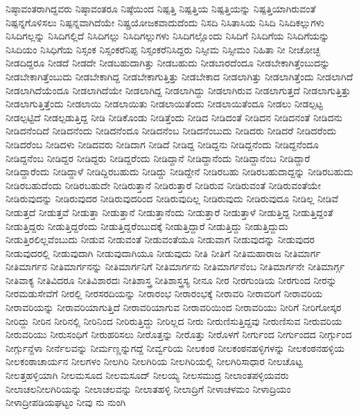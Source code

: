 {ನಿಷ್ಠಾವಂತರಾಗಿದ್ದವರು
ನಿಷ್ಠಾವಂತರೂ
ನಿಷ್ಠೆಯಿಂದ
ನಿಷ್ಪತ್ತಿ
ನಿಷ್ಪತ್ತಿಯ
ನಿಷ್ಪತ್ತಿಯನ್ನು
ನಿಷ್ಪತ್ತಿಯಾಗಿರುವಂತೆ
ನಿಷ್ಪನ್ನಗೊಳಿಸಲು
ನಿಷ್ಪನ್ನವಾಗಿದೆಯೇ
ನಿಷ್ಪ್ರಯೋಜಕವಾದುದೆಂದು
ನಿಸದಿ
ನಿಸಿತಾಸಿಯ
ನಿಸಿದಿ
ನಿಸಿದಿಕಲ್ಲುಗಳು
ನಿಸಿದಿಗಲ್ಲನ್ನು
ನಿಸಿದಿಗಲ್ಲಿದೆ
ನಿಸಿದಿಗಲ್ಲು
ನಿಸಿದಿಗಲ್ಲುಗಳು
ನಿಸಿದಿಗಲ್ಲೊಂದು
ನಿಸಿದಿಗೆ
ನಿಸಿದಿಗೆಯ
ನಿಸಿದಿಗೆಯನ್ನು
ನಿಸಿದಿಯಂ
ನಿಸಿಧಿಗೆಯ
ನಿಸ್ಸಂಕ
ನಿಸ್ಸಂಕರೆನಿಪ್ಪ
ನಿಸ್ಸಂಕರೆನಿಸಿದ್ದರು
ನಿಸ್ಸೀಮ
ನಿಸ್ಸೀಮಂ
ನಿಹಿತಾ
ನೀ
ನೀಚೋಚ್ಛ
ನೀಡದಿದ್ದರೂ
ನೀಡದೆ
ನೀಡದೇ
ನೀಡಬಹುದಾಗಿತ್ತು
ನೀಡಬಹುದು
ನೀಡಬಾರದೆಂದೂ
ನೀಡಬೇಕಾಗಿತ್ತೆಂಬುದನ್ನು
ನೀಡಬೇಕಾಗಿತ್ತೆಂಬುದು
ನೀಡಬೇಕಾಗಿದ್ದ
ನೀಡಬೇಕಾಗುತ್ತಿತ್ತು
ನೀಡಬೇಕಾದ
ನೀಡಲಾಗಿತ್ತು
ನೀಡಲಾಗಿತ್ತೆಂದು
ನೀಡಲಾಗಿದೆ
ನೀಡಲಾಗಿದೆಯೆಂದೂ
ನೀಡಲಾಗಿದೆಯೇ
ನೀಡಲಾಗಿದ್ದ
ನೀಡಲಾಗಿದ್ದು
ನೀಡಲಾಗಿರುವ
ನೀಡಲಾಗುತ್ತದೆ
ನೀಡಲಾಗುತ್ತಿತ್ತು
ನೀಡಲಾಗುತ್ತಿತ್ತೆಂದು
ನೀಡಲಾಯಿ
ನೀಡಲಾಯಿತು
ನೀಡಲಾಯಿತೆಂದು
ನೀಡಲಾಯಿತೆಂದೂ
ನೀಡಲು
ನೀಡಲ್ಪಟ್ಟ
ನೀಡಲ್ಪಟ್ಟಿದೆ
ನೀಡಲ್ಪಡುತ್ತಿದ್ದ
ನೀಡಿ
ನೀಡಿಕೊಂಡು
ನೀಡಿತ್ತೆಂದು
ನೀಡಿದ
ನೀಡಿದಂತೆ
ನೀಡಿದನ
ನೀಡಿದನಂತೆ
ನೀಡಿದನು
ನೀಡಿದನೆಂದಿದೆ
ನೀಡಿದನೆಂದು
ನೀಡಿದನೆಂದೂ
ನೀಡಿದನೆಂಬ
ನೀಡಿದನೆಂಬುದು
ನೀಡಿದರು
ನೀಡಿದರೆ
ನೀಡಿದರೆಂದು
ನೀಡಿದರೆಂಬ
ನೀಡಿದಳು
ನೀಡಿದವರು
ನೀಡಿದಾಗ
ನೀಡಿದೆ
ನೀಡಿದ್ದ
ನೀಡಿದ್ದನು
ನೀಡಿದ್ದನೆಂದು
ನೀಡಿದ್ದನೆಂದೂ
ನೀಡಿದ್ದನೆಂಬ
ನೀಡಿದ್ದರ
ನೀಡಿದ್ದರು
ನೀಡಿದ್ದರೆಂದು
ನೀಡಿದ್ದಾನೆ
ನೀಡಿದ್ದಾನೆಂದು
ನೀಡಿದ್ದಾನೆಂಬ
ನೀಡಿದ್ದಾರೆ
ನೀಡಿದ್ದಾರೆಂದು
ನೀಡಿದ್ದಾಳೆ
ನೀಡಿದ್ದಿರಬಹುದು
ನೀಡಿದ್ದು
ನೀಡಿದ್ದೇನೆ
ನೀಡಿರಬಹು
ನೀಡಿರಬಹುದಾದ್ದನ್ನು
ನೀಡಿರಬಹುದು
ನೀಡಿರಬಹುದೆಂದು
ನೀಡಿರಬಹುದೇ
ನೀಡಿರುತ್ತಾನೆ
ನೀಡಿರುತ್ತಾರೆ
ನೀಡಿರುವ
ನೀಡಿರುವಂತೆ
ನೀಡಿರುವಂತೆಯೇ
ನೀಡಿರುವುದನ್ನು
ನೀಡಿರುವುದರ
ನೀಡಿರುವುದರಿಂದ
ನೀಡಿರುವುದಿಲ್ಲ
ನೀಡಿರುವುದು
ನೀಡಿರುವುದೂ
ನೀಡಿಲ್ಲ
ನೀಡಿವೆ
ನೀಡುತ್ತದೆ
ನೀಡುತ್ತವೆ
ನೀಡುತ್ತಾ
ನೀಡುತ್ತಾನೆ
ನೀಡುತ್ತಾನೆಂದು
ನೀಡುತ್ತಾರೆ
ನೀಡುತ್ತಾಳೆ
ನೀಡುತ್ತಿದ್ದ
ನೀಡುತ್ತಿದ್ದಂತೆ
ನೀಡುತ್ತಿದ್ದರು
ನೀಡುತ್ತಿದ್ದರೆಂದು
ನೀಡುತ್ತಿದ್ದರೆಂಬುದಕ್ಕೆ
ನೀಡುತ್ತಿದ್ದಾರೆ
ನೀಡುತ್ತಿದ್ದು
ನೀಡುತ್ತಿದ್ದುದು
ನೀಡುತ್ತಿರಲಿಲ್ಲವೆಂಬುದು
ನೀಡುವ
ನೀಡುವಂತೆ
ನೀಡುವಂತೆಯೂ
ನೀಡುವಾಗ
ನೀಡುವುದನ್ನು
ನೀಡುವುದರ
ನೀಡುವುದರಲ್ಲಿ
ನೀಡುವುದಾಗಿ
ನೀಡುವುದಾಗಿಯೂ
ನೀಡುವುದು
ನೀತಿ
ನೀತಿಗೆ
ನೀತಿಮಹಾರಾಜ
ನೀತಿಮಾರ್ಗ
ನೀತಿಮಾರ್ಗನ
ನೀತಿಮಾರ್ಗನನ್ನು
ನೀತಿಮಾರ್ಗನಿಗೆ
ನೀತಿಮಾರ್ಗನು
ನೀತಿಮಾರ್ಗನೆಂಬ
ನೀತಿಮಾರ್ಗನೇ
ನೀತಿಮಾರ್ಗ್ಗ
ನೀತಿವಾಕ್ಯ
ನೀತಿವಿದರೂ
ನೀತಿವಿಶಾರದಃ
ನೀತಿಶಾಸ್ತ್ರ
ನೀತಿಶಾಸ್ತ್ರಸ್ಯ
ನೀನೂ
ನೀರ
ನೀರಗುಂಡಿಯ
ನೀರಗುಂದ
ನೀರನ್ನು
ನೀರಮಡುಸೇವೆಗೆ
ನೀರಲ್ಲಿ
ನೀರಸರದಿಯನ್ನು
ನೀರಾರಂಭ
ನೀರಾರಂಭಕ್ಕೆ
ನೀರಾವರಿ
ನೀರಾವರಿಗೆ
ನೀರಾವರಿಯ
ನೀರಾವರಿಯನ್ನು
ನೀರಾವರಿಯಾಗುತ್ತಿದೆ
ನೀರಾವರಿಯಾಗುವ
ನೀರಾವರಿಯಿಂದ
ನೀರಾವರಿಯು
ನೀರಿಗೆ
ನೀರಿಗೋಸ್ಕರ
ನೀರಿದ್ದು
ನೀರಿನ
ನೀರಿನಲ್ಲಿ
ನೀರಿನಿಂದ
ನೀರಿರುತ್ತಿದ್ದು
ನೀರಿಲ್ಲದ
ನೀರು
ನೀರುಣಿಸುತ್ತಿದ್ದವು
ನೀರುಣಿಸುವ
ನೀರುವರಿಯ
ನೀರುವರಿಯು
ನೀರುಸಂಧಿಗೆ
ನೀರುಹರಿಸಲು
ನೀರೊತ್ತನ್ನು
ನೀರೊತ್ತು
ನೀರೊಳಗೆ
ನೀರ್ಗುಂದ
ನೀರ್ಗುಂದದ
ನೀರ್ಗ್ಗುಂದ
ನೀರ್ಗ್ಗುನ್ದೆಳಾ
ನೀರ್ನೆಲವನ್ನು
ನೀರ್ಮಣ್ಣನ್ನುಗದ್ದೆ
ನೀರ್ವ್ವರಿಯ
ನೀಲಕಂಠ
ನೀಲಕಂಠನಹಳ್ಳಿಗಳನ್ನು
ನೀಲಕಂಠನಹಳ್ಳಿಯ
ನೀಲಕಂಠಾಚಾರ್ಯನ
ನೀಲಗಳಂ
ನೀಲಗಿರಿ
ನೀಲಗಿರಿಯ
ನೀಲಗಿರಿಯಲ್ಲಿ
ನೀಲಗಿರಿಸಾಧಾರ
ನೀಲಚೊಟ್ಟ
ನೀಲತ್ತಹಳ್ಳಿಯಾಗಿ
ನೀಲಮಸೂದ
ನೀಲಮಸೂದ್
ನೀಲಯ್ಯ
ನೀಲಸಮುದ್ರ
ನೀಲಾಂತಪಳ್ಳಿಯವರು
ನೀಲಾಚಲನೀಲಗಿರಿಯನ್ನು
ನೀಲಾಚಲವನ್ನು
ನೀಲಾತಹಳ್ಳಿ
ನೀಲಾದ್ರಿಗೆ
ನೀಳಾಚಳಮಂ
ನೀಳಾದ್ರಿಯಂ
ನೀಳಾದ್ರೀಪಡಿಯಘಟ್ಟಂ
ನೀವು
ನು
ನುಂಗಿ
}

